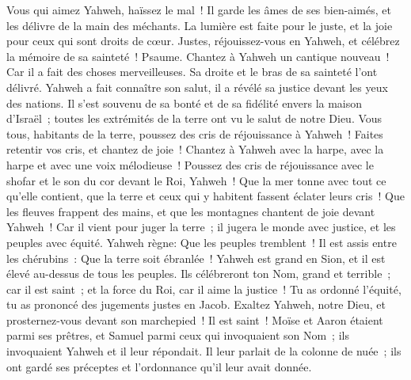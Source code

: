 \begin{multicols}{2}
Vous qui aimez Yahweh, haïssez le mal~! Il garde les âmes de ses bien-aimés, et les délivre de la main des méchants.
La lumière est faite pour le juste, et la joie pour ceux qui sont droits de cœur.
Justes, réjouissez-vous en Yahweh, et célébrez la mémoire de sa sainteté~!
\VerseOne{}Psaume. Chantez à Yahweh un cantique nouveau~! Car il a fait des choses merveilleuses. Sa droite et le bras de sa sainteté l'ont délivré.
Yahweh a fait connaître son salut, il a révélé sa justice devant les yeux des nations.
Il s'est souvenu de sa bonté et de sa fidélité envers la maison d'Israël~; toutes les extrémités de la terre ont vu le salut de notre Dieu.
Vous tous, habitants de la terre, poussez des cris de réjouissance à Yahweh~! Faites retentir vos cris, et chantez de joie~!
Chantez à Yahweh avec la harpe, avec la harpe et avec une voix mélodieuse~!
Poussez des cris de réjouissance avec le shofar et le son du cor devant le Roi, Yahweh~!
Que la mer tonne avec tout ce qu'elle contient, que la terre et ceux qui y habitent fassent éclater leurs cris~!
Que les fleuves frappent des mains, et que les montagnes chantent de joie
devant Yahweh~! Car il vient pour juger la terre~; il jugera le monde avec justice, et les peuples avec équité.
\VerseOne{}Yahweh règne: Que les peuples tremblent~! Il est assis entre les chérubins~: Que la terre soit ébranlée~!
Yahweh est grand en Sion, et il est élevé au-dessus de tous les peuples.
Ils célébreront ton Nom, grand et terrible~; car il est saint~;
et la force du Roi, car il aime la justice~! Tu as ordonné l'équité, tu as prononcé des jugements justes en Jacob.
Exaltez Yahweh, notre Dieu, et prosternez-vous devant son marchepied~! Il est saint~!
Moïse et Aaron étaient parmi ses prêtres, et Samuel parmi ceux qui invoquaient son Nom~; ils invoquaient Yahweh et il leur répondait.
Il leur parlait de la colonne de nuée~; ils ont gardé ses préceptes et l'ordonnance qu'il leur avait donnée.

\end{multicols}
